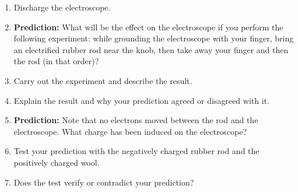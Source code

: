 \begin{enumerate}
\item Discharge the electroscope.
\item \textbf{Prediction:} What will be the effect on the electroscope if
you perform the following experiment: while grounding the electroscope
with your finger, bring an electrified rubber rod near the knob, then
take away your finger and then the rod (in that order)?\vspace{15mm}

\item Carry out the experiment and describe the result.\vspace{15mm}

\item Explain the result and why your prediction agreed or disagreed with
it.\vspace{15mm}

\item \textbf{Prediction:} Note that no electrons moved between the rod
and the electroscope. What charge has been induced on the electroscope?\vspace{15mm}

\item Test your prediction with the negatively charged rubber rod and the
positively charged wool.
\item Does the test verify or contradict your prediction?\vspace{15mm}
\end{enumerate}

